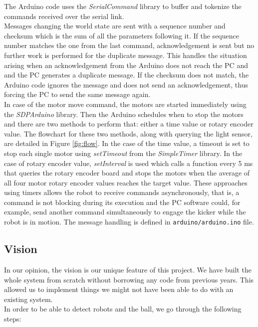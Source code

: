 \documentclass[a4paper,12pt]{article}
\begin{document}
The Arduino code uses the \textit{SerialCommand} library to buffer and tokenize the
commands received over the serial link.
\\Messages changing the world state are sent with a sequence number and checksum which is the sum of all the parameters following it. If the sequence number matches the one from the last command, acknowledgement is sent but no further work is performed for the duplicate message. This handles the situation arising when an acknowledgement from the Arduino does not reach the PC and and the PC generates a duplicate message. If the checksum does not match, the Arduino code ignores the message and does not send an acknowledgement, thus forcing the PC to send the same message again.
\\In case of the motor move command, the motors are started immediately using the \textit{SDPArduino} library. Then the Arduino schedules when to stop the motors and there are two methods to perform that: either a time value or rotary encoder value. The flowchart for these two methods, along with querying the light sensor, are detailed in Figure \ref{fig:flow}.
In the case of the time value, a timeout is set to stop each single motor using
\textit{setTimeout} from the \textit{SimpleTimer} library.
In the case of rotary encoder value, \textit{setInterval} is used which calls
a function every 5 ms that queries the rotary encoder board and stops the motors
when the average of all four motor rotary encoder values reaches the target value. These approaches using timers
allows the robot to receive commands asynchronously, that is, a command is not
blocking during its execution and the PC software could, for example, send another command simultaneously to engage the kicker while the robot is in motion.
The message handling is defined in \texttt{arduino/arduino.ino} file.

\subsection{Vision}

In our opinion, the vision is our unique feature of this project. We have built the whole system from scratch without borrowing any code from previous years. This allowed us to implement things we might not have been able to do with an existing system. 
\\In order to be able to detect robots and the ball, we go through the following steps:
\end{document}
